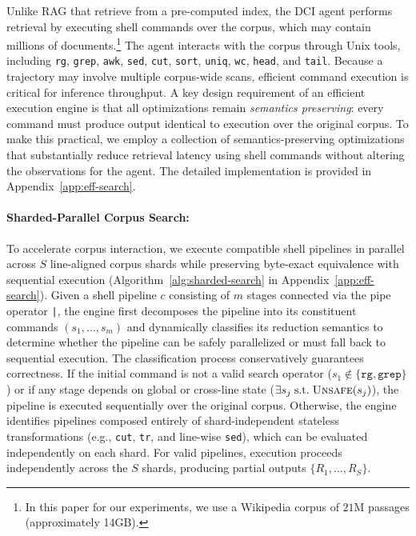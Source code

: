 \documentclass{article} %
\begin{document}
Unlike RAG that retrieve from a pre-computed index, the DCI agent performs retrieval by executing shell commands over the corpus, which may contain millions of documents.\footnote{In this paper for our experiments, we use a Wikipedia corpus of $21$M passages (approximately 14GB).} The agent interacts with the corpus through Unix tools, including \texttt{rg}, \texttt{grep}, \texttt{awk}, \texttt{sed}, \texttt{cut}, \texttt{sort}, \texttt{uniq}, \texttt{wc}, \texttt{head}, and \texttt{tail}. Because a trajectory may involve multiple corpus-wide scans, efficient command execution is critical for inference throughput. A key design requirement of an efficient execution engine is that all optimizations remain \emph{semantics preserving}: every command must produce output identical to execution over the original corpus. To make this practical, we employ a collection of semantics-preserving optimizations that substantially reduce retrieval latency using shell commands without altering the observations for the agent. The detailed implementation is provided in Appendix~\ref{app:eff-search}.


\paragraph{Sharded-Parallel Corpus Search:} 


To accelerate corpus interaction, we execute compatible shell pipelines in parallel across $S$ line-aligned corpus shards while preserving byte-exact equivalence with sequential execution (Algorithm~\ref{alg:sharded-search} in Appendix~\ref{app:eff-search}). Given a shell pipeline $c$ consisting of $m$ stages connected via the pipe operator \texttt{|}, the engine first decomposes the pipeline into its constituent commands $(s_1, \dots, s_m)$ and dynamically classifies its reduction semantics to determine whether the pipeline can be safely parallelized or must fall back to sequential execution. The classification process conservatively guarantees correctness. If the initial command is not a valid search operator ($s_1 \notin \{\texttt{rg}, \texttt{grep}\}$) or if any stage depends on global or cross-line state ($\exists s_j \;\text{s.t.}\; \textsc{Unsafe}(s_j)$), the pipeline is executed sequentially over the original corpus. Otherwise, the engine identifies pipelines composed entirely of shard-independent stateless transformations (e.g., \texttt{cut}, \texttt{tr}, and line-wise \texttt{sed}), which can be evaluated independently on each shard. For valid pipelines, execution proceeds independently across the $S$ shards, producing partial outputs $\{R_1,\dots,R_S\}$. 
\end{document}
